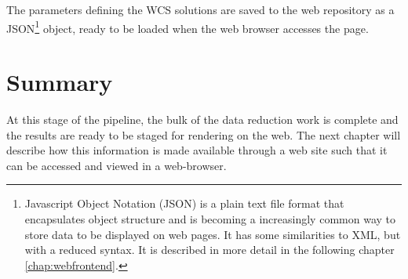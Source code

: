 The parameters defining the WCS solutions are saved to the web repository as a JSON\footnote{Javascript Object Notation (JSON) is a plain text file format that encapsulates object structure and is becoming a increasingly common way to store data to be displayed on web pages. It has some similarities to XML, but with a reduced syntax. It is described in more detail in the following chapter \ref{chap:webfrontend}.} object, ready to be loaded when the web browser accesses the page. 

\section{Summary}
At this stage of the pipeline, the bulk of the data reduction work is complete and the results are ready to be staged for rendering on the web. The next chapter will describe how this information is made available through a web site such that it can be accessed and viewed in a web-browser. 
